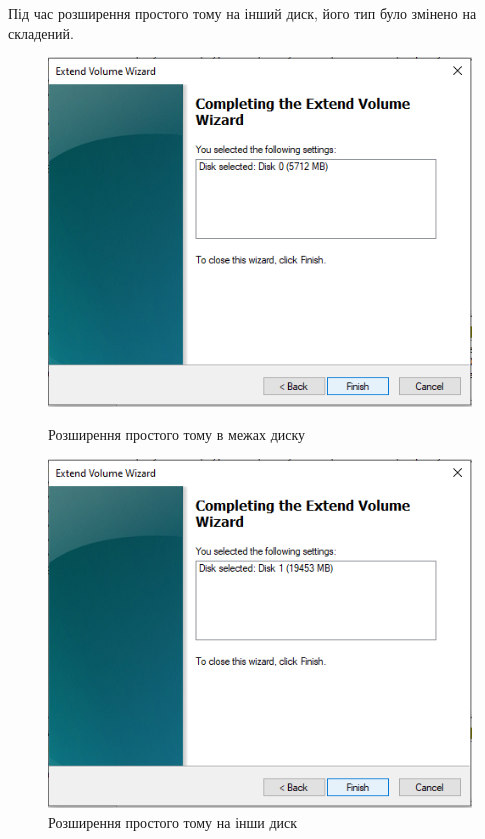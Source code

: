 \documentclass[oneside,14pt]{extarticle}
\begin{document}
\begin{normalsize}
	Під час розширення простого тому на інший диск, його тип було змінено на складений.
	
	\begin{figure}[H]
		\centering
		\begin{minipage}{0.45\textwidth}
			\centering
			\includegraphics[scale=0.6]{16}
			\caption{Розширення простого тому в межах диску}
		\end{minipage}
		\hfill
		\begin{minipage}{0.45\textwidth}
			\centering
			\includegraphics[scale=0.6]{17}
			\caption{Розширення простого тому на інши диск}
		\end{minipage}
	\end{figure}
	

\end{normalsize}
\end{document}
